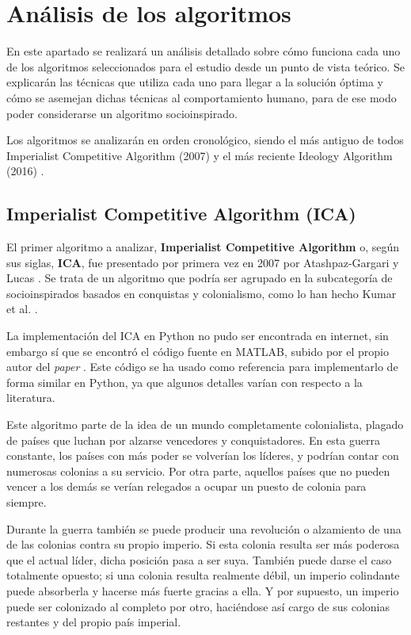 \chapter{Análisis de los algoritmos}

En este apartado se realizará un análisis detallado sobre cómo funciona cada uno de los algoritmos seleccionados para el estudio desde un punto de vista teórico. Se explicarán las técnicas que utiliza cada uno para llegar a la solución óptima y cómo se asemejan dichas técnicas al comportamiento humano, para de ese modo poder considerarse un algoritmo socioinspirado.

Los algoritmos se analizarán en orden cronológico, siendo el más antiguo de todos Imperialist Competitive Algorithm (2007) \cite{ica-conference} y el más reciente Ideology Algorithm (2016) \cite{ia-article}.

\section{Imperialist Competitive Algorithm (ICA)}

El primer algoritmo a analizar, \textbf{Imperialist Competitive Algorithm} o, según sus siglas, \textbf{ICA}, fue presentado por primera vez en 2007 por Atashpaz-Gargari y Lucas \cite{ica-conference}. Se trata de un algoritmo que podría ser agrupado en la subcategoría de socioinspirados basados en conquistas y colonialismo, como lo han hecho Kumar et al. \cite{socio-evolution-algorithm}.

La implementación del ICA en Python no pudo ser encontrada en internet, sin embargo sí que se encontró el código fuente en MATLAB, subido por el propio autor del \textit{paper} \cite{ica-matlab}. Este código se ha usado como referencia para implementarlo de forma similar en Python, ya que algunos detalles varían con respecto a la literatura.

Este algoritmo parte de la idea de un mundo completamente colonialista, plagado de países que luchan por alzarse vencedores y conquistadores. En esta guerra constante, los países con más poder se volverían los líderes, y podrían contar con numerosas colonias a su servicio. Por otra parte, aquellos países que no pueden vencer a los demás se verían relegados a ocupar un puesto de colonia para siempre.

Durante la guerra también se puede producir una revolución o alzamiento de una de las colonias contra su propio imperio. Si esta colonia resulta ser más poderosa que el actual líder, dicha posición pasa a ser suya. También puede darse el caso totalmente opuesto; si una colonia resulta realmente débil, un imperio colindante puede absorberla y hacerse más fuerte gracias a ella. Y por supuesto, un imperio puede ser colonizado al completo por otro, haciéndose así cargo de sus colonias restantes y del propio país imperial.

